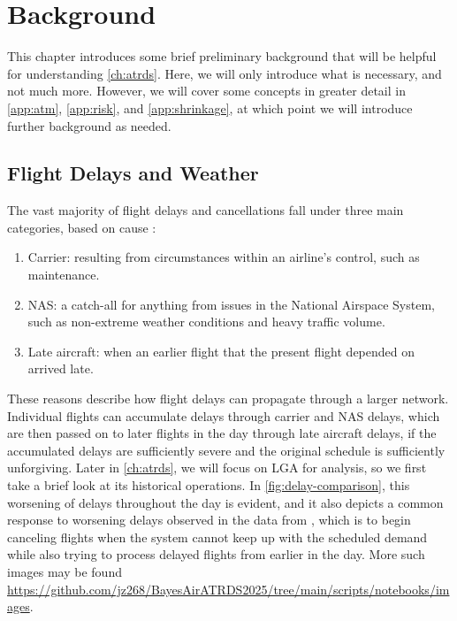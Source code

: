 \chapter{Background}
\label{ch:background}

This chapter introduces some brief preliminary background that will be helpful for understanding \cref{ch:atrds}. Here, we will only introduce what is necessary, and not much more. However, we will cover some concepts in greater detail in \cref{app:atm}, \cref{app:risk}, and \cref{app:shrinkage}, at which point we will introduce further background as needed.

\section{Flight Delays and Weather}

The vast majority of flight delays and cancellations fall under three main categories, based on cause \cite{bts_causes_2024}:
\begin{enumerate}
    \item Carrier: resulting from circumstances within an airline's control, such as maintenance.
    \item NAS: a catch-all for anything from issues in the National Airspace System, such as non-extreme weather conditions and heavy traffic volume.
    \item Late aircraft: when an earlier flight that the present flight depended on arrived late.
\end{enumerate}

These reasons describe how flight delays can propagate through a larger network. Individual flights can accumulate delays through carrier and NAS delays, which are then passed on to later flights in the day through late aircraft delays, if the accumulated delays are sufficiently severe and the original schedule is sufficiently unforgiving. Later in \cref{ch:atrds}, we will focus on LGA for analysis, so we first take a brief look at its historical operations. In \cref{fig:delay-comparison}, this worsening of delays throughout the day is evident, and it also depicts a common response to worsening delays observed in the data from \cite{bts_transstats_nodate}, which is to begin canceling flights when the system cannot keep up with the scheduled demand while also trying to process delayed flights from earlier in the day. More such images may be found \href{here}{https://github.com/jz268/BayesAirATRDS2025/tree/main/scripts/notebooks/images}.


